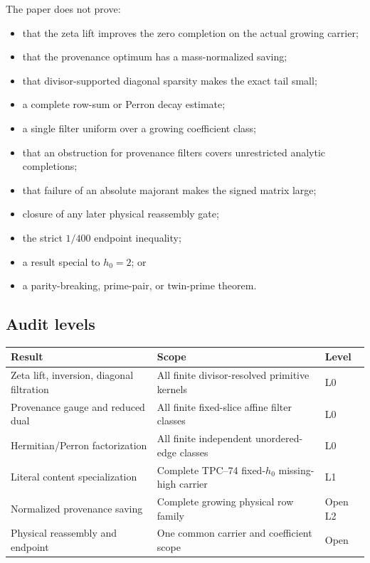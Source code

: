 The paper does not prove:
\begin{itemize}
 \item that the zeta lift improves the zero completion on the actual
       growing carrier;
 \item that the provenance optimum has a mass-normalized saving;
 \item that divisor-supported diagonal sparsity makes the exact tail
       small;
 \item a complete row-sum or Perron decay estimate;
 \item a single filter uniform over a growing coefficient class;
 \item that an obstruction for provenance filters covers unrestricted
       analytic completions;
 \item that failure of an absolute majorant makes the signed matrix large;
 \item closure of any later physical reassembly gate;
 \item the strict \(1/400\) endpoint inequality;
 \item a result special to \(h_0=2\); or
 \item a parity-breaking, prime-pair, or twin-prime theorem.
\end{itemize}

\subsection{Audit levels}

\begin{center}
\begin{tabular}{p{}p{}l}
\toprule
Result & Scope & Level\\
\midrule
Zeta lift, inversion, diagonal filtration &
All finite divisor-resolved primitive kernels & L0\\
Provenance gauge and reduced dual &
All finite fixed-slice affine filter classes & L0\\
Hermitian/Perron factorization &
All finite independent unordered-edge classes & L0\\
Literal content specialization &
Complete TPC--74 fixed-\(h_0\) missing-high carrier & L1\\
Normalized provenance saving &
Complete growing physical row family & Open L2\\
Physical reassembly and endpoint &
One common carrier and coefficient scope & Open\\
\bottomrule
\end{tabular}
\end{center}

